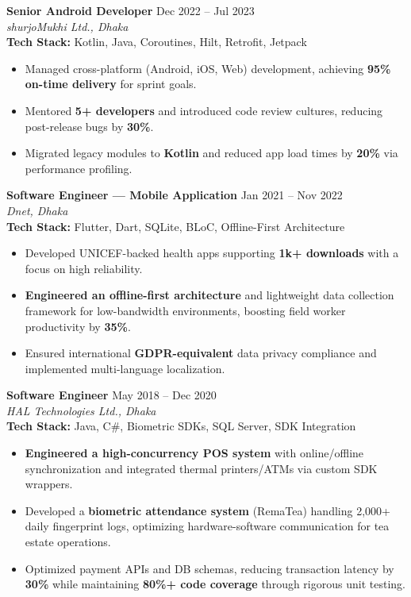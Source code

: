 \documentclass[10pt,a4paper]{article}
\begin{document}
\vspace{6pt}

\textbf{Senior Android Developer} \hfill Dec 2022 -- Jul 2023 \\
\textit{shurjoMukhi Ltd., Dhaka} \\
\textbf{Tech Stack:} Kotlin, Java, Coroutines, Hilt, Retrofit, Jetpack
\begin{itemize}
    \item Managed cross-platform (Android, iOS, Web) development, achieving \textbf{95\% on-time delivery} for sprint goals.
    \item Mentored \textbf{5+ developers} and introduced code review cultures, reducing post-release bugs by \textbf{30\%}.
    \item Migrated legacy modules to \textbf{Kotlin} and reduced app load times by \textbf{20\%} via performance profiling.
\end{itemize}

\vspace{6pt}

\textbf{Software Engineer — Mobile Application} \hfill Jan 2021 -- Nov 2022 \\
\textit{Dnet, Dhaka} \\
\textbf{Tech Stack:} Flutter, Dart, SQLite, BLoC, Offline-First Architecture
\begin{itemize}
    \item Developed UNICEF-backed health apps supporting \textbf{1k+ downloads} with a focus on high reliability.
    \item \textbf{Engineered an offline-first architecture} and lightweight data collection framework for low-bandwidth environments, boosting field worker productivity by \textbf{35\%}.
    \item Ensured international \textbf{GDPR-equivalent} data privacy compliance and implemented multi-language localization.
\end{itemize}

\vspace{6pt}

\textbf{Software Engineer} \hfill May 2018 -- Dec 2020 \\
\textit{HAL Technologies Ltd., Dhaka} \\
\textbf{Tech Stack:} Java, C\#, Biometric SDKs, SQL Server, SDK Integration
\begin{itemize}
    \item \textbf{Engineered a high-concurrency POS system} with online/offline synchronization and integrated thermal printers/ATMs via custom SDK wrappers.
    \item Developed a \textbf{biometric attendance system} (RemaTea) handling 2,000+ daily fingerprint logs, optimizing hardware-software communication for tea estate operations.
    \item Optimized payment APIs and DB schemas, reducing transaction latency by \textbf{30\%} while maintaining \textbf{80\%+ code coverage} through rigorous unit testing.
\end{itemize}
\end{document}
